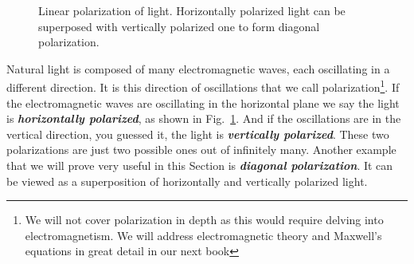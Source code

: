 \begin{figure}[t]
    \centering
    \caption[Linear polarization of light.]{Linear polarization of light. Horizontally polarized light can be superposed with vertically polarized one to form diagonal polarization.}
    \label{fig:polarization}
\end{figure}

Natural light is composed of many electromagnetic waves, each oscillating in a different direction.
It is this direction of oscillations that we call polarization\footnote{We will not cover polarization in depth as this would require delving into electromagnetism. We will address electromagnetic theory and Maxwell's equations in great detail in our next book}.
If the electromagnetic waves are oscillating in the horizontal plane we say the light is \textbf{\emph{horizontally polarized}}, as shown in Fig.~\ref{fig:polarization}.
And if the oscillations are in the vertical direction, you guessed it, the light is \textbf{\emph{vertically polarized}}.
These two polarizations are just two possible ones out of infinitely many.
Another example that we will prove very useful in this Section is \textbf{\emph{diagonal polarization}}.
It can be viewed as a superposition of horizontally and vertically polarized light.

